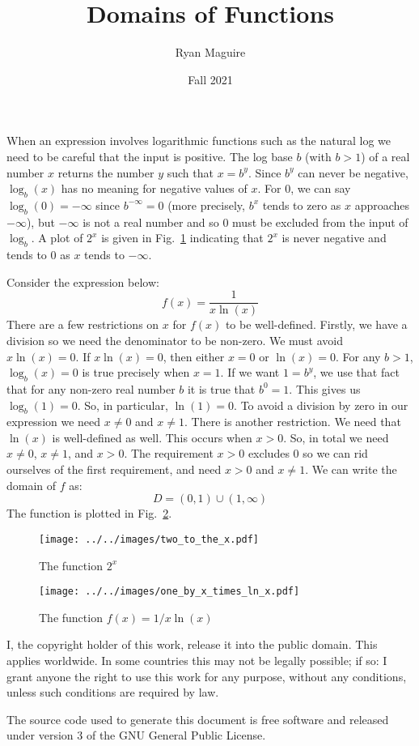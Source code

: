 \documentclass{article}
\title{Domains of Functions}
\author{Ryan Maguire}
\date{Fall 2021}
\begin{document}
    \maketitle
    When an expression involves logarithmic functions such as the natural
    log we need to be careful that the input is positive. The log base
    $b$ (with $b>1$) of a real number $x$ returns the number $y$ such that
    $x=b^{y}$. Since $b^{y}$ can never be negative, $\log_{b}(x)$ has no
    meaning for negative values of $x$. For 0, we can say
    $\log_{b}(0)=-\infty$ since $b^{-\infty}=0$ (more precisely, $b^{x}$ tends
    to zero as $x$ approaches $-\infty$), but $-\infty$ is not a real
    number and so 0 must be excluded from the input of $\log_{b}$.
    A plot of $2^{x}$ is given in Fig.~\ref{fig:two_to_the_x} indicating that
    $2^{x}$ is never negative and tends to $0$ as $x$ tends to $-\infty$.
    \par\hfill\par
    Consider the expression below:
    \begin{equation}
        f(x)=\frac{1}{x\ln(x)}
    \end{equation}
    There are a few restrictions on $x$ for $f(x)$ to be well-defined. Firstly,
    we have a division so we need the denominator to be non-zero. We must
    avoid $x\ln(x)=0$. If $x\ln(x)=0$, then either $x=0$ or $\ln(x)=0$. For
    any $b>1$, $\log_{b}(x)=0$ is true precisely when $x=1$. If we want
    $1=b^{y}$, we use that fact that for any non-zero real number $b$ it is
    true that $b^{0}=1$. This gives us $\log_{b}(1)=0$. So, in particular,
    $\ln(1)=0$. To avoid a division by zero in our expression we need
    $x\ne{0}$ and $x\ne{1}$. There is another restriction. We need that
    $\ln(x)$ is well-defined as well. This occurs when $x>0$. So, in total
    we need $x\ne{0}$, $x\ne{1}$, and $x>0$. The requirement $x>0$ excludes
    0 so we can rid ourselves of the first requirement, and need
    $x>0$ and $x\ne{1}$. We can write the domain of $f$ as:
    \begin{equation}
        D=(0,1)\cup(1,\infty)
    \end{equation}
    The function is plotted in Fig.~\ref{fig:one_by_x_lnx}.
    \begin{figure}
        \centering
        \texttt{[image: ../../images/two\_to\_the\_x.pdf]}
        \caption{The function $2^{x}$}
        \label{fig:two_to_the_x}
    \end{figure}
    \begin{figure}
        \centering
        \texttt{[image: ../../images/one\_by\_x\_times\_ln\_x.pdf]}
        \caption{The function $f(x)=1/x\ln(x)$}
        \label{fig:one_by_x_lnx}
    \end{figure}
    \newpage
    I, the copyright holder of this work, release it into the public domain.
    This applies worldwide. In some countries this may not be legally possible;
    if so: I grant anyone the right to use this work for any purpose, without
    any conditions, unless such conditions are required by law.
    \par\hfill\par
    The source code used to generate this document is free software and released
    under version 3 of the GNU General Public License.
\end{document}
